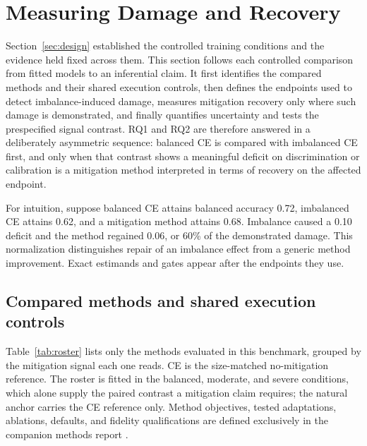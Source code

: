 \documentclass[11pt]{article}
\begin{document}
\section{Measuring Damage and Recovery}
\label{sec:analysis}
Section~\ref{sec:design} established the controlled training conditions and the evidence held fixed across them. This section follows each controlled comparison from fitted models to an inferential claim. It first identifies the compared methods and their shared execution controls, then defines the endpoints used to detect imbalance-induced damage, measures mitigation recovery only where such damage is demonstrated, and finally quantifies uncertainty and tests the prespecified signal contrast. RQ1 and RQ2 are therefore answered in a deliberately asymmetric sequence: balanced CE is compared with imbalanced CE first, and only when that contrast shows a meaningful deficit on discrimination or calibration is a mitigation method interpreted in terms of recovery on the affected endpoint.

For intuition, suppose balanced CE attains balanced accuracy \num{0.72}, imbalanced CE attains \num{0.62}, and a mitigation method attains \num{0.68}. Imbalance caused a \num{0.10} deficit and the method regained \num{0.06}, or 60\% of the demonstrated damage. This normalization distinguishes repair of an imbalance effect from a generic method improvement. Exact estimands and gates appear after the endpoints they use.

\subsection{Compared methods and shared execution controls}
\label{sec:methods}
\label{sec:training}
Table~\ref{tab:roster} lists only the methods evaluated in this benchmark, grouped by the mitigation signal each one reads. CE is the size-matched no-mitigation reference. The roster is fitted in the balanced, moderate, and severe conditions, which alone supply the paired contrast a mitigation claim requires; the natural anchor carries the CE reference only. Method objectives, tested adaptations, ablations, defaults, and fidelity qualifications are defined exclusively in the companion methods report \citep{queisler2026imbalanceMethods}.
\end{document}
